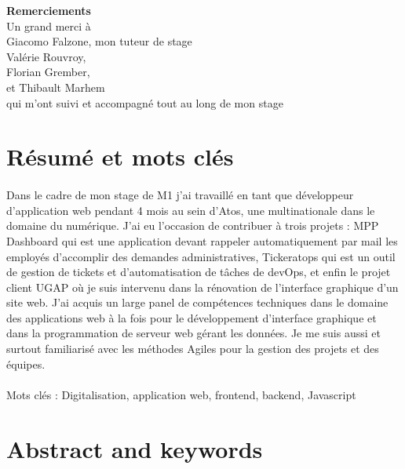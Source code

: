 \documentclass[12pt]{article}
\begin{document}
\begin {sloppypar}
\newpage 

\begin{center}
  \LARGE
  \textbf{Remerciements}
  \vspace{5cm}\\
  \normalsize
  Un grand merci à\\ 
  Giacomo Falzone, mon tuteur de stage\\
  Valérie Rouvroy, \\
  Florian Grember, \\
  et Thibault Marhem \\
  qui m'ont suivi et accompagné tout au long de mon stage
\end{center}
\newpage

\def\contentsname{Sommaires}
\tableofcontents
\newpage

\renewcommand{\listfigurename}{Table des matières des illustrations}
\listoffigures
\newpage

\section*{Résumé et mots clés}
\paragraph{}
Dans le cadre de mon stage de M1 j'ai travaillé en tant que développeur d'application 
web pendant 4 mois au sein d'Atos, une multinationale dans le domaine du numérique. 
J'ai eu l'occasion de contribuer à trois projets : MPP Dashboard qui est une application 
devant rappeler automatiquement par mail les employés d'accomplir des demandes administratives, 
Tickeratops qui est un outil de gestion de tickets et d'automatisation de tâches de devOps, et enfin 
le projet client UGAP où je suis intervenu dans la rénovation de l'interface graphique d'un site web. 
J'ai acquis un large panel de compétences techniques dans le domaine des applications web à la fois 
pour le développement d'interface graphique et dans la programmation de serveur web gérant les données.
Je me suis aussi et surtout familiarisé avec les méthodes Agiles pour la gestion des projets et des équipes.
\paragraph{}
Mots clés : Digitalisation, application web, frontend, backend, Javascript
\newpage

\section*{Abstract and keywords}

\end{sloppypar}
\end{document}
